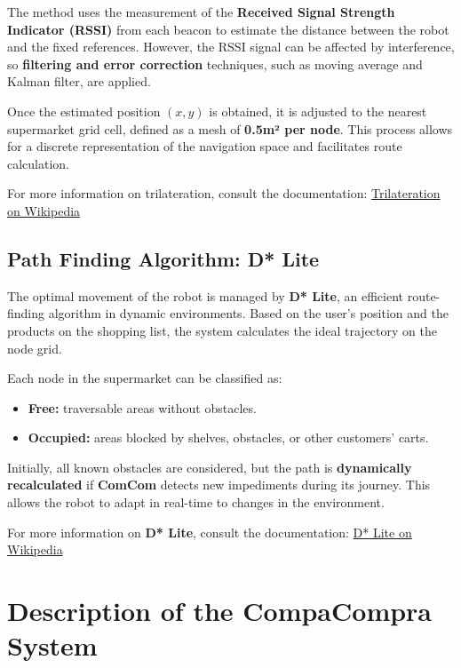 \documentclass[a4paper,12pt]{article}
\begin{document}
The method uses the measurement of the \textbf{Received Signal Strength Indicator (RSSI)} from each beacon to estimate the distance between the robot and the fixed references. However, the RSSI signal can be affected by interference, so \textbf{filtering and error correction} techniques, such as moving average and Kalman filter, are applied.

Once the estimated position \((x, y)\) is obtained, it is adjusted to the nearest supermarket grid cell, defined as a mesh of \textbf{0.5m² per node}. This process allows for a discrete representation of the navigation space and facilitates route calculation.

For more information on trilateration, consult the documentation:
\href{https://en.wikipedia.org/wiki/Trilateration}{Trilateration on Wikipedia}

\subsection{Path Finding Algorithm: D* Lite}
The optimal movement of the robot is managed by \textbf{D* Lite}, an efficient route-finding algorithm in dynamic environments. Based on the user's position and the products on the shopping list, the system calculates the ideal trajectory on the node grid.

Each node in the supermarket can be classified as:
\begin{itemize}
\item \textbf{Free:} traversable areas without obstacles.
\item \textbf{Occupied:} areas blocked by shelves, obstacles, or other customers' carts.
\end{itemize}

Initially, all known obstacles are considered, but the path is \textbf{dynamically recalculated} if \textbf{ComCom} detects new impediments during its journey. This allows the robot to adapt in real-time to changes in the environment.

For more information on \textbf{D* Lite}, consult the documentation:
\href{https://en.wikipedia.org/wiki/D*_Lite}{D* Lite on Wikipedia} %

\section{Description of the CompaCompra System}
\end{document}
